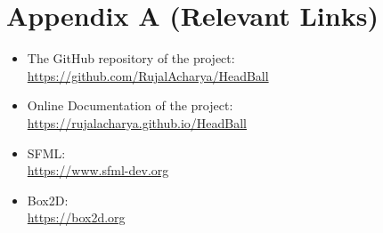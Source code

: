 \documentclass[main]{subfiles}
\begin{document}
\chapter*{\centering Appendix A (Relevant Links)}

\begin{itemize}
    \item The GitHub repository of the project:\\ \url{https://github.com/RujalAcharya/HeadBall}
    
    \item Online Documentation of the project:\\ \url{https://rujalacharya.github.io/HeadBall}
    
    \item SFML:\\
    \url{https://www.sfml-dev.org}
    
    \item Box2D:\\
    \url{https://box2d.org}
\end{itemize}
\end{document}

